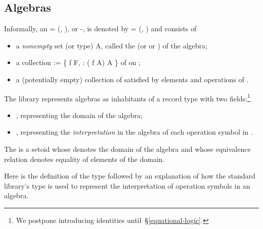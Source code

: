 \subsection{Algebras}\label{algebras}
Informally, an   = (, ), or
-, is denoted by  = (, ) and consists of
\begin{itemize}
\item a \emph{nonempty} set (or type) \ab A, called the  (or  or
) of the algebra;
\item a collection  :=
  \{   \ab f  \ab F,  \as :
    ( \ab f  \ab A)  \ab A \} of  on ;
\item a (potentially empty) collection of  satisfied by elements and
operations of .
\end{itemize}
The \agdaalgebras library represents algebras as inhabitants of a record type with two
fields:\footnote{We postpone introducing identities until~§\ref{equational-logic}.}
\begin{itemize}
\item {}, representing the domain of the algebra;
\item {}, representing the \emph{interpretation} in the algebra of each
operation symbol in .
\end{itemize}
The  is a setoid whose  denotes the domain of the algebra and
whose equivalence relation denotes equality of elements of the domain.

Here is the definition of the  type followed by an explanation of how the
standard library's  type is used to represent the interpretation of operation
symbols in an algebra.

